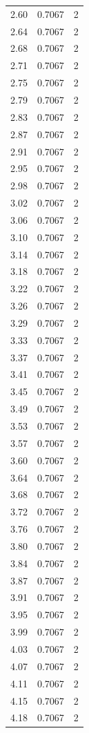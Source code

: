 \begin{longtable}{lrr}
  2.60 & 0.7067 & 2 \\
  2.64 & 0.7067 & 2 \\
  2.68 & 0.7067 & 2 \\
  2.71 & 0.7067 & 2 \\
  2.75 & 0.7067 & 2 \\
  2.79 & 0.7067 & 2 \\
  2.83 & 0.7067 & 2 \\
  2.87 & 0.7067 & 2 \\
  2.91 & 0.7067 & 2 \\
  2.95 & 0.7067 & 2 \\
  2.98 & 0.7067 & 2 \\
  3.02 & 0.7067 & 2 \\
  3.06 & 0.7067 & 2 \\
  3.10 & 0.7067 & 2 \\
  3.14 & 0.7067 & 2 \\
  3.18 & 0.7067 & 2 \\
  3.22 & 0.7067 & 2 \\
  3.26 & 0.7067 & 2 \\
  3.29 & 0.7067 & 2 \\
  3.33 & 0.7067 & 2 \\
  3.37 & 0.7067 & 2 \\
  3.41 & 0.7067 & 2 \\
  3.45 & 0.7067 & 2 \\
  3.49 & 0.7067 & 2 \\
  3.53 & 0.7067 & 2 \\
  3.57 & 0.7067 & 2 \\
  3.60 & 0.7067 & 2 \\
  3.64 & 0.7067 & 2 \\
  3.68 & 0.7067 & 2 \\
  3.72 & 0.7067 & 2 \\
  3.76 & 0.7067 & 2 \\
  3.80 & 0.7067 & 2 \\
  3.84 & 0.7067 & 2 \\
  3.87 & 0.7067 & 2 \\
  3.91 & 0.7067 & 2 \\
  3.95 & 0.7067 & 2 \\
  3.99 & 0.7067 & 2 \\
  4.03 & 0.7067 & 2 \\
  4.07 & 0.7067 & 2 \\
  4.11 & 0.7067 & 2 \\
  4.15 & 0.7067 & 2 \\
  4.18 & 0.7067 & 2 \\

\end{longtable}

